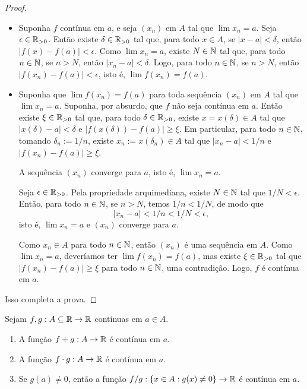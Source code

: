 \begin{proof}
    \leavevmode
        \begin{itemize}
            \item[($\Rightarrow$)] Suponha $f$ contínua em $a$, e seja $(x_n)$ em $A$ tal que $\lim x_n = a$. Seja $\epsilon \in \mathbb{R}_{>0}$. Então existe $\delta \in \mathbb{R}_{>0}$ tal que, para todo $x \in A$, se $|x-a|<\delta$, então $|f(x) - f(a)|<\epsilon$. Como $\lim x_n = a$, existe $N \in \mathbb{N}$ tal que, para todo $n \in \mathbb{N}$, se $n > N$, então $|x_n - a| < \delta$. Logo, para todo $n \in \mathbb{N}$, se $n > N$, então $|f(x_n) - f(a)| < \epsilon$, isto é, $\lim f(x_n) = f(a)$.
            \item[($\Leftarrow$)] Suponha que $\lim f(x_n) = f(a)$ para toda sequência $(x_n)$ em $A$ tal que $\lim x_n = a$. Suponha, por absurdo, que $f$ não seja contínua em $a$. Então existe $\xi \in \mathbb{R}_{>0}$ tal que, para todo $\delta \in \mathbb{R}_{>0}$, existe $x = x(\delta) \in A$ tal que $|x(\delta)-a|<\delta$ e $|f(x(\delta))-f(a)| \geq \xi$. Em particular, para todo $n \in \mathbb{N}$, tomando $\delta_n := 1/n$, existe $x_n := x(\delta_n) \in A$ tal que $|x_n - a|< 1/n$ e $|f(x_n)-f(a)| \geq \xi$.
                \begin{claim}
                    A sequência $(x_n)$ converge para $a$, isto é, $\lim x_n = a$.
                \end{claim}
                \begin{midproof}
                    Seja $\epsilon \in \mathbb{R}_{>0}$. Pela propriedade arquimediana, existe $N \in \mathbb{N}$ tal que $1/N < \epsilon$. Então, para todo $n \in \mathbb{N}$, se $n > N$, temos $1/n < 1/N$, de modo que
                        \[
                            |x_n - a| < 1/n < 1/N < \epsilon,
                        \]
                    isto é, $\lim x_n = a$ e $(x_n)$ converge para $a$. \whiteproof
                \end{midproof}
            Como $x_n \in A$ para todo $n \in \mathbb{N}$, então $(x_n)$ é uma sequência em $A$. Como $\lim x_n = a$, deveríamos ter $\lim f(x_n) = f(a)$, mas existe $\xi \in \mathbb{R}_{>0}$ tal que $|f(x_n)-f(a)| \geq \xi$ para todo $n \in \mathbb{N}$, uma contradição. Logo, $f$ é contínua em $a$.
        \end{itemize}
    Isso completa a prova. \blackproof
\end{proof}

\begin{theorem}
    Sejam $f,g : A \subseteq \mathbb{R} \to \mathbb{R}$ contínuas em $a \in A$.
        \begin{enumerate}[leftmargin=*, align=left, label=\textbf{(\alph*)}]
            \item A função $f+g : A \to \mathbb{R}$ é contínua em $a$.
            \item A função $f \cdot g : A \to \mathbb{R}$ é contínua em $a$.
            \item Se $g(a) \neq 0$, então a função $f / g : \{x \in A : g(x) \neq 0 \} \to \mathbb{R}$ é contínua em $a$.
        \end{enumerate}
\end{theorem}

